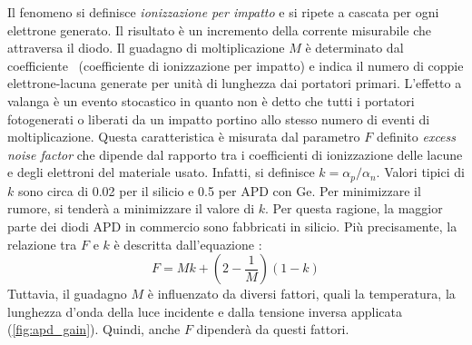 Il fenomeno si definisce \textit{ionizzazione per impatto} e si ripete a cascata per ogni elettrone generato. Il risultato è un incremento della corrente misurabile che attraversa il diodo. Il guadagno di moltiplicazione $M$ è determinato dal coefficiente \textalpha\ (coefficiente di ionizzazione per impatto) e indica il numero di coppie elettrone-lacuna generate per unità di lunghezza \cite{Jiang2019} dai portatori primari.
L'effetto a valanga è un evento stocastico in quanto non è detto che tutti i portatori fotogenerati o liberati da un impatto portino allo stesso numero di eventi di moltiplicazione. Questa caratteristica è misurata dal parametro $F$ definito \textit{excess noise factor} che dipende dal rapporto tra i coefficienti di ionizzazione delle lacune e degli elettroni del materiale usato. Infatti, si definisce $k=\alpha_p / \alpha_n$. Valori tipici di $k$ sono circa di 0.02 per il silicio e 0.5 per APD con Ge. Per minimizzare il rumore, si tenderà a minimizzare il valore di $k$. Per questa ragione, la maggior parte dei diodi APD in commercio sono fabbricati in silicio. Più precisamente, la relazione tra $F$ e $k$ è descritta dall'equazione \cite{HAMAMATSU2021}\cite{Hossain2019}:
\begin{equation}
	F=Mk+(2-\frac{1}{M})(1-k)
\end{equation}
Tuttavia, il guadagno $M$ è influenzato da diversi fattori, quali la temperatura, la lunghezza d'onda della luce incidente e dalla tensione inversa applicata (\Fig\ref{fig:apd_gain}). Quindi, anche $F$ dipenderà da questi fattori. 
